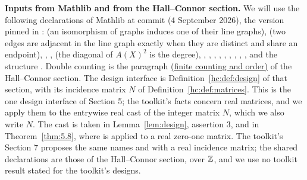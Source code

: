 \begingroup\raggedright
\medskip\noindent\textbf{Inputs from Mathlib and from the Hall--Connor section.}\label{facts:sec5}
We will use the following declarations of Mathlib at commit 
(4 September 2026), the version pinned in :  (an isomorphism of graphs induces one of
their line graphs),  (two edges are adjacent in the
line graph exactly when they are distinct and share an endpoint),
, ,
 (the diagonal of $A(X)^2$ is the degree),
, ,
, , ,
, ,
, , 
and the structure . Double counting is the paragraph
\hyperref[hc:facts:finite]{(finite counting and order)} of the Hall--Connor section. The
design interface is Definition~\ref{hc:def:design} of that section, with its incidence matrix
$N$ of Definition~\ref{hc:def:matrices}. This is the one design interface of Section 5; the
toolkit's facts concern real matrices, and we apply them to the entrywise real cast of the
integer matrix $N$, which we also write $N$. The cast is taken in Lemma~\ref{lem:design},
assertion 3, and in Theorem~\ref{thm:5.8}, where  is applied to a real zero-one
matrix. The toolkit's Section 7 proposes the same names  and
 with a real incidence matrix; the shared declarations are those of the
Hall--Connor section, over ${\mathbb Z}$, and we use no toolkit result stated for the toolkit's
designs.\par
\endgroup

